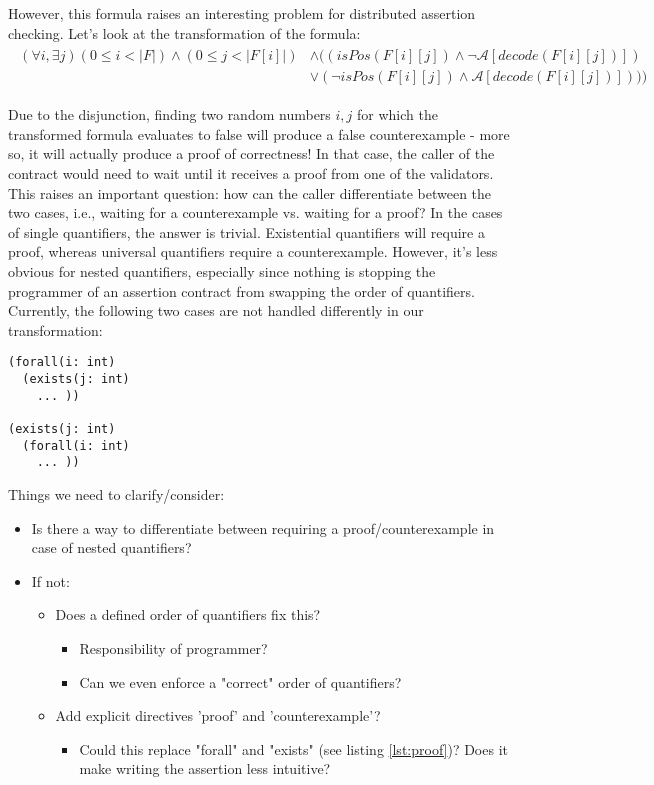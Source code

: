 \documentclass{article}
\begin{document}
However, this formula raises an interesting problem for distributed assertion checking. Let's look at the transformation of the formula:
\begin{gather*}\label{eq:cnf_sat_formal}
\begin{aligned}
(\forall i, \exists j) (0 \leq i < |F|) \wedge (0 \leq j < |F[i]|) &\wedge ((isPos(F[i][j]) \wedge \neg \mathcal{A}[decode(F[i][j])]) \\
&\vee (\neg isPos(F[i][j]) \wedge \mathcal{A}[decode(F[i][j])])))
\end{aligned}
\end{gather*}

Due to the disjunction, finding two random numbers $i,j$ for which the transformed formula evaluates to false will produce a false counterexample - more so, it will actually produce a proof of correctness! In that case, the caller of the contract would need to wait until it receives a proof from one of the validators. \\
This raises an important question: how can the caller differentiate between the two cases, i.e., waiting for a counterexample vs. waiting for a proof?
In the cases of single quantifiers, the answer is trivial. Existential quantifiers will require a proof, whereas universal quantifiers require a counterexample. However, it's less obvious for nested quantifiers, especially since nothing is stopping the programmer of an assertion contract from swapping the order of quantifiers. Currently, the following two cases are not handled differently in our transformation:
\begin{lstlisting}
(forall(i: int)
  (exists(j: int)
    ... ))

(exists(j: int)
  (forall(i: int)
    ... ))
\end{lstlisting}

Things we need to clarify/consider:
\begin{itemize}
    \item Is there a way to differentiate between requiring a proof/counterexample in case of nested quantifiers?
    \item If not:
        \begin{itemize}
            \item Does a defined order of quantifiers fix this?
                \begin{itemize}
                    \item Responsibility of programmer?
                    \item Can we even enforce a "correct" order of quantifiers?
                \end{itemize}
            \item Add explicit directives 'proof' and 'counterexample'?
            \begin{itemize}
                \item Could this replace "forall" and "exists" (see listing \ref{lst:proof})? Does it make writing the assertion less intuitive?
            \end{itemize}
        \end{itemize}
\end{itemize}
\end{document}
